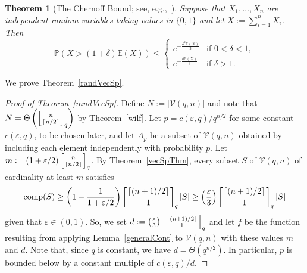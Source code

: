 \documentclass[11 pt]{article}
\newtheorem{thm}[equation]{Theorem}
\theoremstyle{definition}
\theoremstyle{case}
\numberwithin{equation}{section}
\DeclareMathOperator{\comp}{comp}
\newcommand{\qbinom}[3]{\left[\genfrac{}{}{0pt}{}{#1}{#2}\right]_{#3}}
\newcommand{\Vectors}[2]{\mathcal{V}\left(#1,#2\right)}
\begin{document}
\begin{thm}[The Chernoff Bound; see, e.g.,~\cite{ConcentrationBook}]
\label{Cher}
Suppose that $X_1,\dots,X_n$ are independent random variables taking values in $\{0,1\}$ and let $X:=\sum_{i=1}^nX_i$. Then
\[\mathbb{P}(X>(1+\delta)\mathbb{E}(X))\leq 
\begin{cases}  e^{-\frac{\delta^2\mathbb{E}(X)}{3}}& \text{if }0<\delta<1, \\
						  e^{-\frac{\delta\mathbb{E}(X)}{3}}& \text{if }\delta>1.\end{cases}\]
\end{thm}

We prove Theorem~\ref{randVecSp}.

\begin{proof}[Proof of Theorem~\ref{randVecSp}]
Define $N:=|\Vectors{q}{n}|$ and note that $N=\Theta\left(\qbinom{n}{\left\lceil n/2\right\rceil}{q}\right)$ by Theorem~\ref{wilf}. Let $p=c(\varepsilon,q)/q^{n/2}$ for some constant $c(\varepsilon,q)$, to be chosen later, and let $A_p$ be a subset of $\Vectors{q}{n}$ obtained by including each element independently with probability $p$. Let $m:=(1+\varepsilon/2)\qbinom{n}{\left\lceil n/2\right\rceil}{q}$. By Theorem~\ref{vecSpThm}, every subset $S$ of $\Vectors{q}{n}$ of cardinality at least $m$ satisfies
\[\comp(S)\geq \left(1-\frac{1}{1+\varepsilon/2}\right)\qbinom{\left\lceil (n+1)/2\right\rceil}{1}{q}|S|\geq \left(\frac{\varepsilon}{3}\right)\qbinom{\left\lceil (n+1)/2\right\rceil}{1}{q}|S|\]
given that $\varepsilon\in(0,1)$. So, we set $d:=\left(\frac{\varepsilon}{3}\right)\qbinom{\left\lceil (n+1)/2\right\rceil}{1}{q}$ and let $f$ be the function resulting from applying Lemma~\ref{generalCont} to $\Vectors{q}{n}$ with these values $m$ and $d$. Note that, since $q$ is constant, we have $d=\Theta\left(q^{n/2}\right)$. In particular, $p$ is bounded below by a constant multiple of $c(\varepsilon,q)/d$.


\end{proof}
\end{document}
